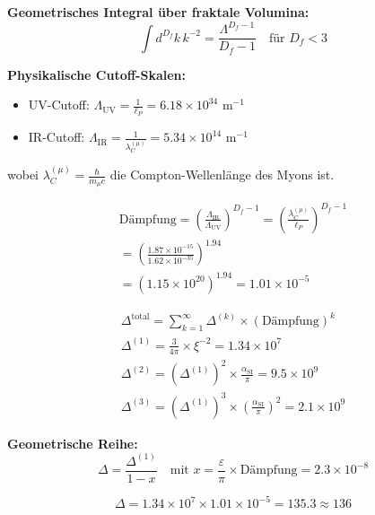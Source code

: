 \documentclass[12pt,a4paper]{article}
\numberwithin{equation}{section}
\newcommand{\xipar}{\xi}
\newcommand{\epsilonT}{\varepsilon}
\newcommand{\alphaSI}{\alpha_{\text{SI}}}
\newcommand{\Df}{D_f}
\newcommand{\lP}{\ell_P}
\newcommand{\lambdaC}{\lambda_C}
\begin{document}
	\textbf{Geometrisches Integral über fraktale Volumina:}
	\begin{equation}
		\int d^{\Df}k \, k^{-2} = \frac{\Lambda^{\Df-1}}{\Df-1} \quad \text{für } \Df < 3
		\label{eq:fractal_integral}
	\end{equation}
	
	\textbf{Physikalische Cutoff-Skalen:}
	\begin{itemize}
		\item UV-Cutoff: $\Lambda_{\text{UV}} = \frac{1}{\lP} = 6.18 \times 10^{34}$ m$^{-1}$
		\item IR-Cutoff: $\Lambda_{\text{IR}} = \frac{1}{\lambdaC^{(\mu)}} = 5.34 \times 10^{14}$ m$^{-1}$
	\end{itemize}
	
	wobei $\lambdaC^{(\mu)} = \frac{\hbar}{m_\mu c}$ die Compton-Wellenlänge des Myons ist.
	
	\begin{align}
		\text{Dämpfung} = \left(\frac{\Lambda_{\text{IR}}}{\Lambda_{\text{UV}}}\right)^{\Df-1} = \left(\frac{\lambdaC^{(\mu)}}{\lP}\right)^{\Df-1}\\
		= \left(\frac{1.87 \times 10^{-15}}{1.62 \times 10^{-35}}\right)^{1.94}\\
		= \left(1.15 \times 10^{20}\right)^{1.94} = 1.01 \times 10^{-5}
		\label{eq:damping_factor}
	\end{align}
	
	\begin{align}
		\Delta^{\text{total}} = \sum_{k=1}^{\infty} \Delta^{(k)} \times (\text{Dämpfung})^k\\
		\Delta^{(1)} = \frac{3}{4\pi} \times \xipar^{-2} = 1.34 \times 10^7\\
		\Delta^{(2)} = (\Delta^{(1)})^2 \times \frac{\alphaSI}{\pi} = 9.5 \times 10^{9}\\
		\Delta^{(3)} = (\Delta^{(1)})^3 \times \left(\frac{\alphaSI}{\pi}\right)^2 = 2.1 \times 10^{9}
		\label{eq:perturbation_series}
	\end{align}
	
	\textbf{Geometrische Reihe:}
	\begin{equation}
		\Delta = \frac{\Delta^{(1)}}{1-x} \quad \text{mit } x = \frac{ \epsilonT}{\pi} \times \text{Dämpfung} = 2.3 \times 10^{-8}
		\label{eq:geometric_series}
	\end{equation}
	
	\begin{equation}
		\Delta = 1.34 \times 10^7 \times 1.01 \times 10^{-5} = 135.3 \approx 136
		\label{eq:delta_final}
	\end{equation}
	
\end{document}
